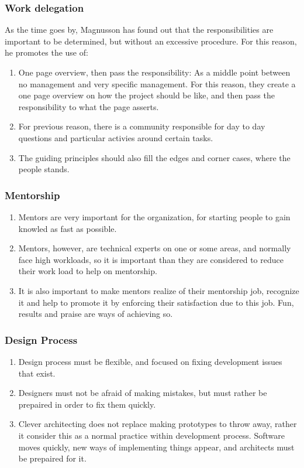 \documentclass[11pt]{article}
\begin{document}
\subsubsection{Work delegation}
As the time goes by, Magnusson has found out that the responsibilities are important to be determined, but without an excessive procedure.
For this reason, he promotes the use of:
\begin{enumerate}\itemsep0pt
\item{One page overview, then pass the responsibility: As a middle point between no management and very specific management. For this reason, they create a one page overview on how the project should be like, and then pass the responsibility to what the page asserts.}
\item{For previous reason, there is a community responsible for day to day questions and particular activies around certain tasks.}
\item{The guiding principles should also fill the edges and corner cases, where the people stands.}
\end{enumerate}

\subsubsection{Mentorship}
\begin{enumerate}\itemsep0pt
\item{Mentors are very important for the organization, for starting people to gain knowled as fast as possible.}
\item{Mentors, however, are technical experts on one or some areas, and normally face high workloads, so it is important than they are considered to reduce their work load to help on mentorship.}
\item{It is also important to make mentors realize of their mentorship job, recognize it and help to promote it by enforcing their satisfaction due to this job. Fun, results and praise are ways of achieving so.}
\end{enumerate}
  
\subsubsection{Design Process}
\begin{enumerate}\itemsep0pt
\item{Design process must be flexible, and focused on fixing development issues that exist.}
\item{Designers must not be afraid of making mistakes, but must rather be prepaired in order to fix them quickly.}
\item{Clever architecting does not replace making prototypes to throw away, rather it consider this as a normal practice within development process. Software moves quickly, new ways of implementing things appear, and architects must be prepaired for it.}
\end{enumerate}
\end{document}

